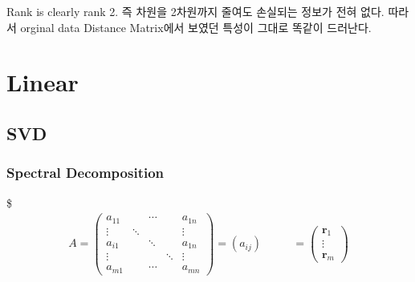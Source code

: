 \documentclass[
]{book}
\begin{document}
{{{Rank is clearly rank 2. 즉 차원을 2차원까지 줄여도 손실되는 정보가 전혀 없다. 따라서 orginal data Distance Matrix에서 보였던 특성이 그대로 똑같이 드러난다.

\hypertarget{linear}{%
\chapter{Linear}\label{linear}}

\hypertarget{svd}{%
\section{SVD}\label{svd}}

\hypertarget{spectral-decomposition-1}{%
\subsection{Spectral Decomposition}\label{spectral-decomposition-1}}

\$
\begin{align}


A = 

\begin{pmatrix} 

a_{11} & & \cdots  &  & a_{1n} \\
\vdots & \ddots &   &  & \vdots \\
a_{i1} & &  \ddots &  & a_{1n} \\
\vdots & &  & \ddots & \vdots \\
a_{m1} & & \cdots  &  & a_{mn}

\end{pmatrix} 

= (a_{ij})









&\; \; \; \; \; \; \;= 

\begin{pmatrix}

\pmb r_1 \\
\vdots \\
\pmb r_m

\end{pmatrix}



\\\

\\\




\end{align}}}}
\end{document}

